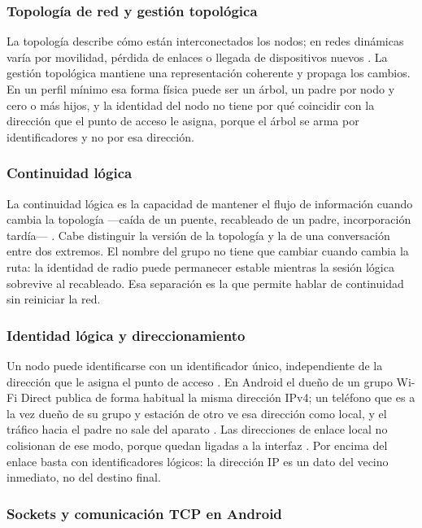 \documentclass[12pt,oneside]{scrreprt}
\begin{document}
\subsubsection{Topología de red y gestión topológica}

La topología describe cómo están interconectados los nodos; en redes dinámicas varía por movilidad, pérdida de enlaces o llegada de dispositivos nuevos \parencite{Karl2005}. La gestión topológica mantiene una representación coherente y propaga los cambios. En un perfil mínimo esa forma física puede ser un árbol, un padre por nodo y cero o más hijos, y la identidad del nodo no tiene por qué coincidir con la dirección que el punto de acceso le asigna, porque el árbol se arma por identificadores y no por esa dirección.

\subsubsection{Continuidad lógica}

La continuidad lógica es la capacidad de mantener el flujo de información cuando cambia la topología ---caída de un puente, recableado de un padre, incorporación tardía--- \parencite{Karl2005}. Cabe distinguir la versión de la topología y la de una conversación entre dos extremos. El nombre del grupo no tiene que cambiar cuando cambia la ruta: la identidad de radio puede permanecer estable mientras la sesión lógica sobrevive al recableado. Esa separación es la que permite hablar de continuidad sin reiniciar la red.

\subsubsection{Identidad lógica y direccionamiento}

Un nodo puede identificarse con un identificador único, independiente de la dirección que le asigna el punto de acceso \parencite{Leach2005}. En Android el dueño de un grupo Wi-Fi Direct publica de forma habitual la misma dirección IPv4; un teléfono que es a la vez dueño de su grupo y estación de otro ve esa dirección como local, y el tráfico hacia el padre no sale del aparato \parencite{Funai2017,Casetti2015}. Las direcciones de enlace local no colisionan de ese modo, porque quedan ligadas a la interfaz \parencite{Hinden2006}. Por encima del enlace basta con identificadores lógicos: la dirección IP es un dato del vecino inmediato, no del destino final.

\subsubsection{Sockets y comunicación TCP en Android}
\end{document}
